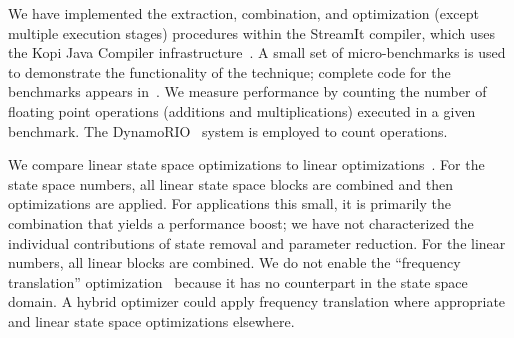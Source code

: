 \label{sec:results}

We have implemented the extraction, combination, and optimization
(except multiple execution stages) procedures within the StreamIt
compiler, which uses the Kopi Java Compiler
infrastructure~\cite{kopi}.  A small set of micro-benchmarks is used
to demonstrate the functionality of the technique; complete code for
the benchmarks appears in~\cite[pp. 67-93]{Agrawal04}.  We measure
performance by counting the number of floating point operations
(additions and multiplications) executed in a given benchmark.  The
DynamoRIO~\cite{dynamo,dynamorio} system is employed to count
operations.

We compare linear state space optimizations to linear
optimizations~\cite{Lamb}.  For the state space numbers, all linear
state space blocks are combined and then optimizations are applied.
For applications this small, it is primarily the combination that
yields a performance boost; we have not characterized the individual
contributions of state removal and parameter reduction.  For the
linear numbers, all linear blocks are combined.  We do not enable the
``frequency translation'' optimization~\cite{Lamb} because it has no
counterpart in the state space domain.  A hybrid optimizer could apply
frequency translation where appropriate and linear state space
optimizations elsewhere.

